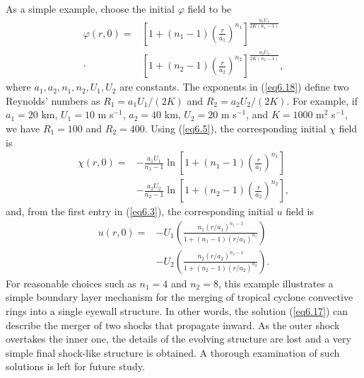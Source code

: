 \documentclass[10pt]{article}
\begin{document}
     As a simple example, choose the initial $\varphi$ field to be
\begin{equation}                                  %
  \begin{split}
     \varphi(r,0) = &\left[1 + (n_1-1)\left(\frac{r}{a_1}\right)^{n_1}\right]^{\frac{a_1 U_1}{2K(n_1-1)}} \\
              \cdot &\left[1 + (n_2-1)\left(\frac{r}{a_2}\right)^{n_2}\right]^{\frac{a_2 U_2}{2K(n_2-1)}},
  \end{split}
\label{eq6.18}
\end{equation}
where $a_1,a_2,n_1,n_2,U_1,U_2$ are constants. The exponents in (\ref{eq6.18}) define two
Reynolds' numbers as $R_1=a_1U_1/(2K)$ and $R_2=a_2U_2/(2K)$. For example, if $a_1=20$ km,
$U_1=10$ m s$^{-1}$, $a_2=40$ km, $U_2=20$ m s$^{-1}$, and $K=1000$ m$^2$ s$^{-1}$,
we have $R_1=100$ and $R_2=400$.
Using (\ref{eq6.5}), the corresponding initial $\chi$ field is
\begin{equation}                                  %
  \begin{split}
     \chi(r,0) = &-\frac{a_1 U_1}{n_1-1} \ln\left[1 + (n_1-1)\left(\frac{r}{a_1}\right)^{n_1}\right] \\
                 &-\frac{a_2 U_2}{n_2-1} \ln\left[1 + (n_2-1)\left(\frac{r}{a_2}\right)^{n_2}\right],
  \end{split}
\label{eq6.19}
\end{equation}
and, from the first entry in (\ref{eq6.3}), the corresponding initial $u$ field is
\begin{equation}                                  %
  \begin{split}
     u(r,0) = &-U_1\left(\frac{n_1(r/a_1)^{n_1-1}}{1 + (n_1-1)(r/a_1)^{n_1}}\right) \\
	      &-U_2\left(\frac{n_2(r/a_2)^{n_2-1}}{1 + (n_2-1)(r/a_2)^{n_2}}\right).
  \end{split}
\label{eq6.20}
\end{equation}
For reasonable choices such as $n_1=4$ and $n_2=8$, this example illustrates a simple boundary layer
mechanism for the merging of tropical cyclone convective rings into a single eyewall structure.
In other words, the solution (\ref{eq6.17}) can describe the merger of two shocks that
propagate inward. As the outer shock overtakes the inner one,
the details of the evolving structure are lost and a very simple final shock-like
structure is obtained. A thorough examination of such solutions is left for future study.
\end{document}
